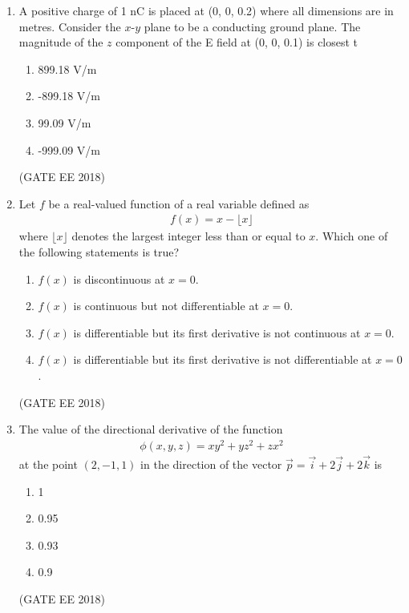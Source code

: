 \documentclass[journal,12pt,onecolumn]{IEEEtran}
\theoremstyle{remark}
\begin{document}
\begin{enumerate}
    \item A positive charge of 1 nC is placed at (0, 0, 0.2) where all dimensions are in metres. Consider the $x$-$y$ plane to be a conducting ground plane. The magnitude of the $z$ component of the E field at (0, 0, 0.1) is closest t
    \begin{multicols}{4}
    \begin{enumerate}
        \item 899.18 V/m
        \item -899.18 V/m
        \item 99.09 V/m
        \item -999.09 V/m
    \end{enumerate}
\end{multicols}  
\hfill{(GATE EE 2018)}

    \item Let $f$ be a real-valued function of a real variable defined as 
    \begin{align*}
    f(x) = x - \lfloor x \rfloor 
    \end{align*}
    where $\lfloor x \rfloor$ denotes the largest integer less than or equal to $x$. Which one of the following statements is true?
    \begin{enumerate}
        \item $f(x)$ is discontinuous at $x=0$.
        \item $f(x)$ is continuous but not differentiable at $x=0$.
        \item $f(x)$ is differentiable but its first derivative is not continuous at $x=0$.
        \item $f(x)$ is differentiable but its first derivative is not differentiable at $x=0$.
    \end{enumerate}
    \hfill{(GATE EE 2018)}

    \item The value of the directional derivative of the function 
    \begin{align*}
    \phi(x, y, z) = xy^{2} + yz^{2} + zx^{2}
    \end{align*}
    at the point $(2, -1, 1)$ in the direction of the vector $\vec{p} = \vec{i} + 2\vec{j} + 2\vec{k}$ is
    \begin{multicols}{4}
    \begin{enumerate}
        \item 1
        \item 0.95
        \item 0.93
        \item 0.9
    \end{enumerate}
    \end{multicols}
    \hfill{(GATE EE 2018)}


\end{enumerate}
\end{document}
